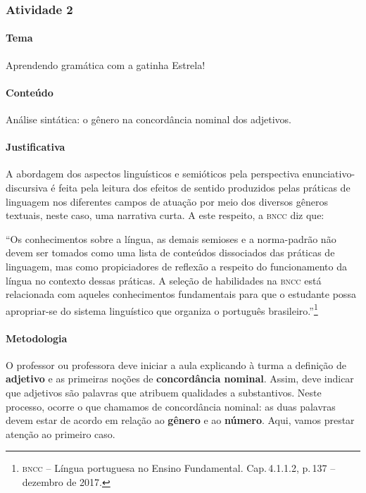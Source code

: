 \documentclass[11pt]{extarticle}
\begin{document}
\subsubsection{Atividade 2}


\paragraph{Tema} Aprendendo gramática com a gatinha Estrela!

\paragraph{Conteúdo} Análise sintática: o gênero na concordância nominal dos adjetivos.

\paragraph{Justificativa} A abordagem dos aspectos linguísticos e semióticos 
pela perspectiva enunciativo-discursiva é feita pela leitura dos efeitos de 
sentido produzidos pelas práticas de linguagem nos diferentes campos de atuação 
por meio dos diversos gêneros textuais, neste caso, uma narrativa curta.
A este respeito, a \textsc{bncc} diz que:

``Os conhecimentos sobre a língua, as demais semioses e a norma-padrão não devem ser tomados como uma lista de conteúdos dissociados das práticas de linguagem, mas como propiciadores de reflexão a respeito do funcionamento da língua no contexto dessas práticas. A seleção de habilidades na \textsc{bncc} está relacionada com aqueles conhecimentos fundamentais para que o estudante possa apropriar-se do sistema linguístico que organiza o português brasileiro.''\footnote{\textsc{bncc} -- Língua portuguesa no Ensino Fundamental. Cap.\,4.1.1.2, p.\,137 -- dezembro de 2017.} 


\paragraph{Metodologia} O professor ou professora deve iniciar a aula explicando à turma a definição de 
\textbf{adjetivo} e as primeiras noções de \textbf{concordância nominal}.
Assim, deve indicar que adjetivos são palavras que atribuem qualidades a substantivos.
Neste processo, ocorre o que chamamos de concordância nominal: as duas palavras devem estar de acordo em relação ao 
\textbf{gênero} e ao \textbf{número}. 
Aqui, vamos prestar atenção ao primeiro caso. 
\end{document}
